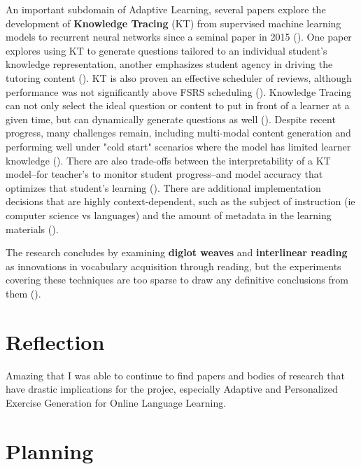 \documentclass[
	letterpaper, %
]{jdf}
\newcommand{\pcite}[1]{(\cite{#1})}
\begin{document}
An important subdomain of Adaptive Learning, several papers explore the development of \textbf{Knowledge Tracing} (KT) from supervised machine learning models to recurrent neural networks since a seminal paper in 2015 \pcite{deep_knowledge_tracing}. One paper explores using KT to generate questions tailored to an individual student's knowledge representation, another emphasizes student agency in driving the tutoring content \pcite{question_generation_adaptive_education, llm_augmented_exercise_retrieval}. KT is also proven an effective scheduler of reviews, although performance was not significantly above FSRS scheduling \pcite{flashcard_scheduler_evolution}. Knowledge Tracing can not only select the ideal question or content to put in front of a learner at a given time, but can dynamically generate questions as well \pcite{generative_information_retrieval}. Despite recent progress, many challenges remain, including multi-modal content generation and performing well under "cold start" scenarios where the model has limited learner knowledge \pcite{knowledge_tracing_survey}. There are also trade-offs between the interpretability of a KT model–for teacher's to monitor student progress–and model accuracy that optimizes that student's learning \pcite{deep_knowledge_tracing}. There are additional implementation decisions that are highly context-dependent, such as the subject of instruction (ie computer science vs languages) and the amount of metadata in the learning materials \pcite{dkt_knowledge_tracing}.

The research concludes by examining \textbf{diglot weaves} and \textbf{interlinear reading} as innovations in vocabulary acquisition through reading, but the experiments covering these techniques are too sparse to draw any definitive conclusions from them \pcite{diglot_weave, hyplern_interlinear_reading}.

\section{Reflection}
Amazing that I was able to continue to find papers and bodies of research that have drastic implications for the projec, especially Adaptive and Personalized Exercise Generation  for Online Language Learning.

\section{Planning}


\printbibliography{}
\end{document}
